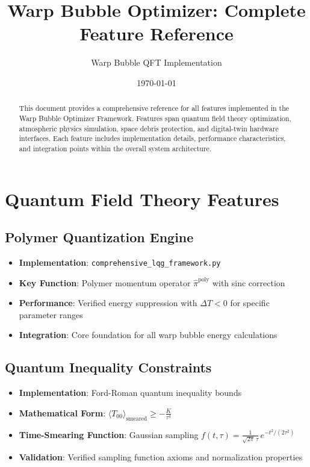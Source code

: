 \documentclass[11pt]{article}
\title{Warp Bubble Optimizer: Complete Feature Reference}
\author{Warp Bubble QFT Implementation}
\date{\today}
\begin{document}
\maketitle

\begin{abstract}
This document provides a comprehensive reference for all features implemented in the Warp Bubble Optimizer Framework. Features span quantum field theory optimization, atmospheric physics simulation, space debris protection, and digital-twin hardware interfaces. Each feature includes implementation details, performance characteristics, and integration points within the overall system architecture.
\end{abstract}

\section{Quantum Field Theory Features}

\subsection{Polymer Quantization Engine}
\begin{itemize}
\item \textbf{Implementation}: \texttt{comprehensive\_lqg\_framework.py}
\item \textbf{Key Function}: Polymer momentum operator $\hat{\pi}^{\text{poly}}$ with sinc correction
\item \textbf{Performance}: Verified energy suppression with $\Delta T < 0$ for specific parameter ranges
\item \textbf{Integration}: Core foundation for all warp bubble energy calculations
\end{itemize}

\subsection{Quantum Inequality Constraints}
\begin{itemize}
\item \textbf{Implementation}: Ford-Roman quantum inequality bounds
\item \textbf{Mathematical Form}: $\langle T_{00} \rangle_{\text{smeared}} \geq -\frac{K}{\tau^4}$
\item \textbf{Time-Smearing Function}: Gaussian sampling $f(t,\tau) = \frac{1}{\sqrt{2\pi}\,\tau}\,e^{-t^2/(2\tau^2)}$
\item \textbf{Validation}: Verified sampling function axioms and normalization properties
\end{itemize}
\end{document}
